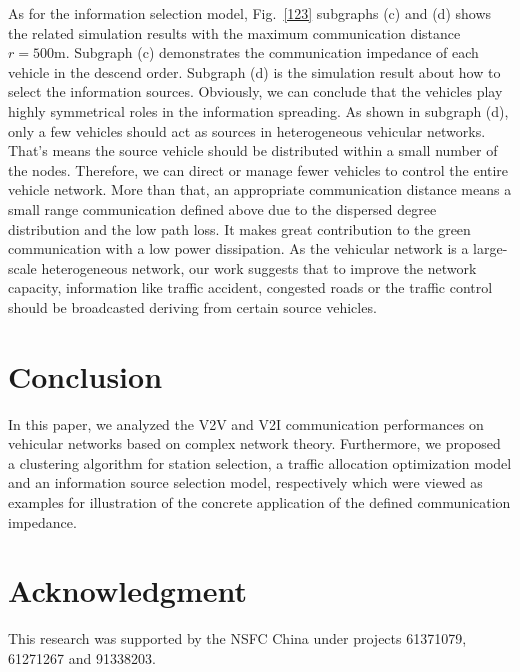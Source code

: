 \documentclass[journal,12pt,draftclsnofoot,onecolumn]{IEEEtran}
\begin{document}
As for the information selection model, Fig.~\ref{123} subgraphs (c) and (d) shows the related simulation results with the maximum communication distance $r=500\mathrm{m}$. Subgraph (c) demonstrates the communication impedance of each vehicle in the descend order. Subgraph (d) is the simulation result about how to select the information sources. Obviously, we can conclude that the vehicles play highly symmetrical roles in the information spreading. As shown in subgraph (d), only a few vehicles should act as sources in heterogeneous vehicular networks. That's means the source vehicle should be distributed within a small number of the nodes. Therefore, we can direct or manage fewer vehicles to control the entire vehicle network. More than that, an appropriate communication distance means a small range communication defined above due to the dispersed degree distribution and the low path loss. It makes great contribution to the green communication with a low power dissipation. As the vehicular network is a large-scale heterogeneous network, our work suggests that to improve the network capacity, information like traffic accident, congested roads or the traffic control should be broadcasted deriving from certain source vehicles.


\section{Conclusion}
\label{Conculsion}
In this paper, we analyzed the V2V and V2I communication performances on vehicular networks based on complex network theory. Furthermore, we proposed a clustering algorithm for station selection, a traffic allocation optimization model and an information source selection model, respectively which were viewed as examples for illustration of the concrete application of the defined communication impedance.

\section*{Acknowledgment}
This research was supported by the NSFC China under projects
61371079, 61271267 and 91338203.



%
\end{document}
